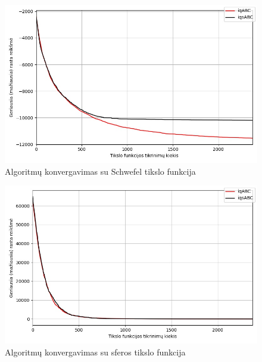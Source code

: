 \documentclass{VUMIFPSmagistrinis}
\begin{document}
\begin{landscape}
\begin{multicols}{2}
\begin{figure}[H]
    \centering
    \includegraphics[scale=0.5]{img/2kg/Schwefel.jpg}
     \caption{Algoritmų konvergavimas su Schwefel tikslo funkcija}
    \label{img:vkon8a}
\end{figure}



\begin{figure}[H]
    \centering
    \includegraphics[scale=0.5]{img/2kg/Sphere.jpg}
     \caption{Algoritmų konvergavimas su sferos tikslo funkcija}
    \label{img:vkon8}
\end{figure}




\end{multicols}
\begin{multicols}{2}



\end{multicols}
\end{landscape}
\end{document}
